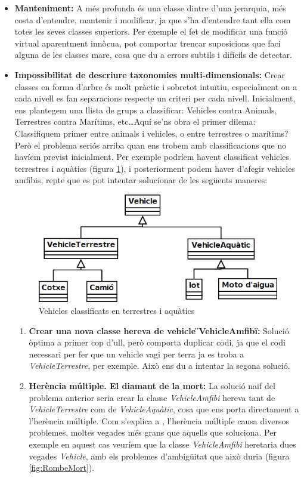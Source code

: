 \begin{itemize}
  \item {\bf Manteniment:} A més profunda és una classe dintre d'una jerarquia, més costa d'entendre, mantenir i modificar, ja que s'ha d'entendre tant ella com totes les seves classes superiors. Per exemple el fet de modificar una funció virtual aparentment innòcua, pot comportar trencar suposicions que faci alguna de les classes mare, cosa que du a errors subtils i difícils de detectar.
    
  \item {\bf Impossibilitat de descriure taxonomies multi-dimensionals:} Crear classes en forma d'arbre és molt pràctic i sobretot intuïtiu, especialment on a cada nivell es fan separacions respecte un criteri per cada nivell. Inicialment, ens plantegem una llista de grups a classificar: Vehicles contra Animals, Terrestres contra Marítims, etc\ldots Aquí se'ns obra el primer dilema: Classifiquem primer entre animals i vehicles, o entre terrestres o marítims? Però el problema seriós arriba quan ens trobem amb classificacions que no havíem previst inicialment. Per exemple podríem havent classificat vehicles terrestres i aquàtics (figura \ref{fig:Vehicles}), i posteriorment podem haver d'afegir vehicles amfibis, repte que es pot intentar solucionar de les següents maneres:
  
  \begin{figure}
    \centering
    \includegraphics[width=0.58\linewidth]{./img/Vehicles.png}
    \caption{Vehicles classificats en terrestres i aquàtics \label{fig:Vehicles}}
  \end{figure}
  
    \begin{enumerate}
      \item {\bf Crear una nova classe hereva de vehicle \"{}VehicleAmfibi\"{}:} Solució òptima a primer cop d'ull, però comporta duplicar codi, ja que el codi necessari per fer que un vehicle vagi per terra ja es troba a {\em VehicleTerrestre}, per exemple. Això ens du a intentar la segona solució.
      
      \item {\bf Herència múltiple. El diamant de la mort:} La solució naïf del problema anterior seria crear la classe {\em VehicleAmfibi} hereva tant de {\em VehicleTerrestre} com de {\em VehicleAquàtic}, cosa que ens porta directament a l'herència múltiple. Com s'explica a \cite[p.~2]{Martin97}, l'herència múltiple causa diversos problemes, moltes vegades més grans que aquells que soluciona. Per exemple en aquest cas veuríem que la classe {\em VehicleAmfibi} heretaria dues vegades {\em Vehicle}, amb els problemes d'ambigüitat que això duria (figura \ref{fig:RombeMort}).
        

\end{enumerate}
\end{itemize}
